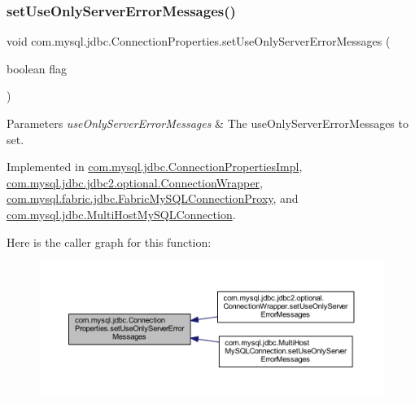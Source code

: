 \subsubsection{\texorpdfstring{set\+Use\+Only\+Server\+Error\+Messages()}{setUseOnlyServerErrorMessages()}}
{\footnotesize\ttfamily void com.\+mysql.\+jdbc.\+Connection\+Properties.\+set\+Use\+Only\+Server\+Error\+Messages (\begin{DoxyParamCaption}\item[{boolean}]{flag }\end{DoxyParamCaption})}


\begin{DoxyParams}{Parameters}
{\em use\+Only\+Server\+Error\+Messages} & The use\+Only\+Server\+Error\+Messages to set. \\
\hline
\end{DoxyParams}


Implemented in \mbox{\hyperlink{classcom_1_1mysql_1_1jdbc_1_1_connection_properties_impl_a6db658411fe1661f96ab7089fa5e9345}{com.\+mysql.\+jdbc.\+Connection\+Properties\+Impl}}, \mbox{\hyperlink{classcom_1_1mysql_1_1jdbc_1_1jdbc2_1_1optional_1_1_connection_wrapper_aeb0a18bb97912baf34e436f5a61e7233}{com.\+mysql.\+jdbc.\+jdbc2.\+optional.\+Connection\+Wrapper}}, \mbox{\hyperlink{classcom_1_1mysql_1_1fabric_1_1jdbc_1_1_fabric_my_s_q_l_connection_proxy_a65a2aeb1ac5c4bf2e717665b8cea6ff6}{com.\+mysql.\+fabric.\+jdbc.\+Fabric\+My\+S\+Q\+L\+Connection\+Proxy}}, and \mbox{\hyperlink{classcom_1_1mysql_1_1jdbc_1_1_multi_host_my_s_q_l_connection_a64cd255943d0563c0246595083a5f2a7}{com.\+mysql.\+jdbc.\+Multi\+Host\+My\+S\+Q\+L\+Connection}}.

Here is the caller graph for this function\+:\nopagebreak
\begin{figure}[H]
\begin{center}
\leavevmode
\includegraphics[width=350pt]{interfacecom_1_1mysql_1_1jdbc_1_1_connection_properties_a4d6983e3fcbf208b481c59edb1aa793b_icgraph}
\end{center}
\end{figure}
\mbox{\label{interfacecom_1_1mysql_1_1jdbc_1_1_connection_properties_a4c83918a441a7c5938d0ec80a975b92b}} 

